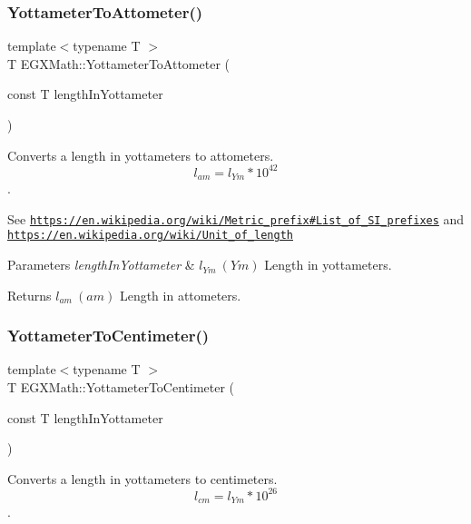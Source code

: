 \subsubsection{\texorpdfstring{Yottameter\+To\+Attometer()}{YottameterToAttometer()}}
{\footnotesize\ttfamily template$<$typename T $>$ \\
T E\+G\+X\+Math\+::\+Yottameter\+To\+Attometer (\begin{DoxyParamCaption}\item[{const T}]{length\+In\+Yottameter }\end{DoxyParamCaption})}



Converts a length in yottameters to attometers. \[ l_{am}=l_{Ym} * 10^{42} \]. 

See \href{https://en.wikipedia.org/wiki/Metric_prefix#List_of_SI_prefixes}{\tt https\+://en.\+wikipedia.\+org/wiki/\+Metric\+\_\+prefix\#\+List\+\_\+of\+\_\+\+S\+I\+\_\+prefixes} and \href{https://en.wikipedia.org/wiki/Unit_of_length}{\tt https\+://en.\+wikipedia.\+org/wiki/\+Unit\+\_\+of\+\_\+length} 
\begin{DoxyParams}{Parameters}
{\em length\+In\+Yottameter} & $ l_{Ym}\ (Ym)$ Length in yottameters. \\
\hline
\end{DoxyParams}
\begin{DoxyReturn}{Returns}
$ l_{am}\ (am)$ Length in attometers. 
\end{DoxyReturn}
\mbox{\label{group___e_g_x_math-_conversions-_length_conversions-_s_i-_yottameter-_s_i_ga29b512ac5c39f960b5f705cfb9bfe226}} 
\subsubsection{\texorpdfstring{Yottameter\+To\+Centimeter()}{YottameterToCentimeter()}}
{\footnotesize\ttfamily template$<$typename T $>$ \\
T E\+G\+X\+Math\+::\+Yottameter\+To\+Centimeter (\begin{DoxyParamCaption}\item[{const T}]{length\+In\+Yottameter }\end{DoxyParamCaption})}



Converts a length in yottameters to centimeters. \[ l_{cm}=l_{Ym} * 10^{26} \]. 

